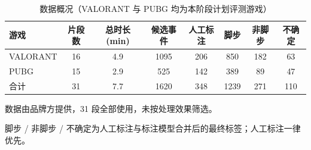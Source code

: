 \begin{table}[htbp]\centering
\caption{数据概况（VALORANT 与 PUBG 均为本阶段计划评测游戏）}\label{tab:data}
{\small\begin{threeparttable}
\begin{tabular}{lccccccc}\toprule
游戏 & 片段数 & 总时长 (min) & 候选事件 & 人工标注 & 脚步 & 非脚步 & 不确定 \\
\midrule
VALORANT & 16 & 4.9 & 1095 & 206 & 850 & 182 & 63 \\
PUBG & 15 & 2.9 & 525 & 142 & 389 & 89 & 47 \\
合计 & 31 & 7.7 & 1620 & 348 & 1239 & 271 & 110 \\
\bottomrule\end{tabular}
\begin{tablenotes}\footnotesize\item 数据由品牌方提供，31 段全部使用，未按处理效果筛选。\item 脚步 / 非脚步 / 不确定为人工标注与标注模型合并后的最终标签；人工标注一律优先。\end{tablenotes}\end{threeparttable}}
\end{table}
